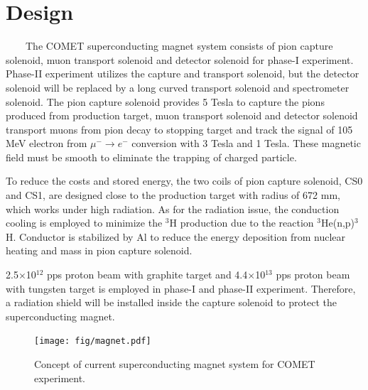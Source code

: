 \documentclass[a4paper, 10pt, twocolumn]{article}
\begin{document}
\section{Design}
~~~~The COMET superconducting magnet system consists of pion capture solenoid, muon transport solenoid and detector solenoid for phase-I experiment.
Phase-II experiment utilizes the capture and transport solenoid, but the detector solenoid will be replaced by a long curved transport solenoid and spectrometer solenoid.
The pion capture solenoid provides 5 Tesla to capture the pions produced from production target, muon transport solenoid and detector solenoid transport muons from pion decay to stopping target and track the signal of 105 MeV electron from $\mu^- \rightarrow e^-$ conversion with 3 Tesla and 1 Tesla.
These magnetic field must be smooth to eliminate the trapping of charged particle.

To reduce the costs and stored energy, the two coils of pion capture solenoid, CS0 and CS1, are designed close to the production target with radius of 672 mm, which works under high radiation.
As for the radiation issue, the conduction cooling is employed to minimize the $^3$H production due to the reaction $^3$He(n,p)$^3$H.
Conductor is stabilized by Al to reduce the energy deposition from nuclear heating and mass in pion capture solenoid.

2.5$\times$10$^{12}$ pps proton beam with graphite target and 4.4$\times$10$^{13}$ pps proton beam with tungsten target is employed in phase-I and phase-II experiment.
Therefore, a radiation shield will be installed inside the capture solenoid to protect the superconducting magnet.
\begin{figure}[H]
 \centering
 \texttt{[image: fig/magnet.pdf]}
 \caption{Concept of current superconducting magnet system for COMET experiment.}
 \label{magnet}
\end{figure}
\end{document}
